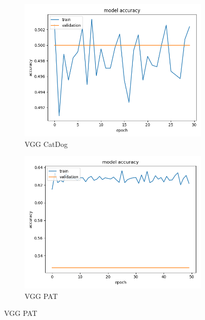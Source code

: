 \begin{figure}
\begin{subfigure}[b]{.45\linewidth}
\includegraphics[width=\linewidth]{Figs/vgg_catdog_acc.jpg}
\caption{VGG CatDog}
\end{subfigure}
\begin{subfigure}[b]{.45\linewidth}
\includegraphics[width=\linewidth]{Figs/vgg_pat_acc.jpg}
\caption{VGG PAT}
\end{subfigure}


\end{figure}
